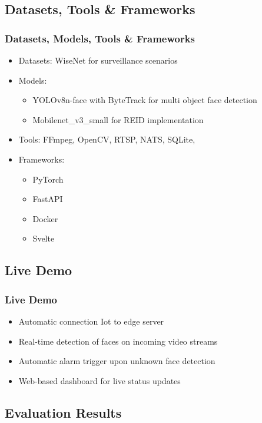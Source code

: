 \documentclass[11pt,t,usepdftitle=false,aspectratio=169]{beamer}
\begin{document}
\subsection{Datasets, Tools \& Frameworks}

\begin{frame}
	\frametitle{Datasets, Models, Tools \& Frameworks}
	\begin{itemize}
		\item Datasets: WiseNet for surveillance scenarios
		\item Models:
		      \begin{itemize}
			      \item YOLOv8n-face with ByteTrack for multi object face detection
			      \item Mobilenet\_v3\_small for REID implementation
		      \end{itemize}
		\item Tools: FFmpeg, OpenCV, RTSP, NATS, SQLite,
		\item Frameworks: 
		\begin{itemize}
			\item PyTorch 
			\item FastAPI
			\item Docker
			\item Svelte  
		\end{itemize}
	\end{itemize}
\end{frame}

\subsection{Live Demo}

\begin{frame}
	\frametitle{Live Demo}
	\begin{itemize}
		\item Automatic connection Iot to edge server
		\item Real-time detection of faces on incoming video streams
		\item Automatic alarm trigger upon unknown face detection
		\item Web-based dashboard for live status updates
	\end{itemize}
\end{frame}

\subsection{Evaluation Results}
\end{document}
